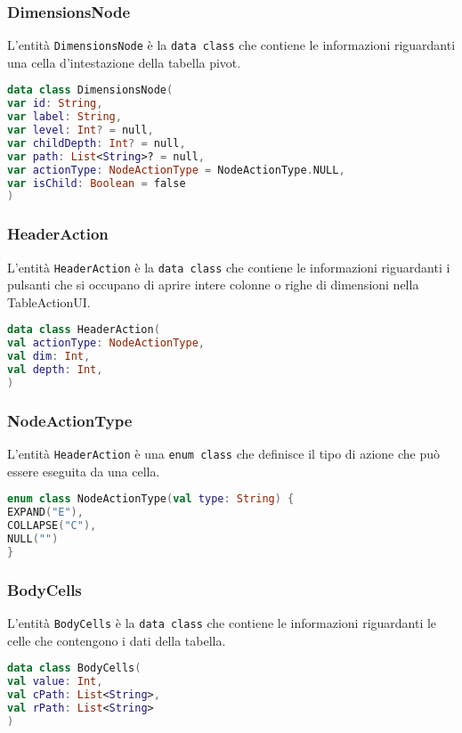 \subsubsection{DimensionsNode}
L'entità \verb|DimensionsNode| è la \verb|data class| che contiene le informazioni riguardanti una cella d'intestazione della tabella pivot.
\begin{lstlisting}[caption={DimensionsNode}, label={lst:dimensionsnode}, language=Kotlin]
data class DimensionsNode(
var id: String,
var label: String,
var level: Int? = null,
var childDepth: Int? = null,
var path: List<String>? = null,
var actionType: NodeActionType = NodeActionType.NULL,
var isChild: Boolean = false
)
\end{lstlisting}

\subsubsection{HeaderAction}
L'entità \verb|HeaderAction| è la \verb|data class| che contiene le informazioni riguardanti i pulsanti che si occupano di aprire intere colonne o righe di dimensioni nella TableActionUI.
\begin{lstlisting}[caption={HeaderAction}, label={lst:headeraction}, language=Kotlin]
data class HeaderAction(
val actionType: NodeActionType,
val dim: Int,
val depth: Int,
)
\end{lstlisting}

\subsubsection{NodeActionType}
L'entità \verb|HeaderAction| è una \verb|enum class| che definisce il tipo di azione che può essere eseguita da una cella.
\begin{lstlisting}[caption={NodeActionType}, label={lst:nodeactiontype}, language=Kotlin]
enum class NodeActionType(val type: String) {
EXPAND("E"),
COLLAPSE("C"),
NULL("")
}
\end{lstlisting}

\subsubsection{BodyCells}
L'entità \verb|BodyCells| è la \verb|data class| che contiene le informazioni riguardanti le celle che contengono i dati della tabella.
\begin{lstlisting}[caption={BodyCells}, label={lst:bodycells}, language=Kotlin]
data class BodyCells(
val value: Int,
val cPath: List<String>,
val rPath: List<String>
)
\end{lstlisting}

